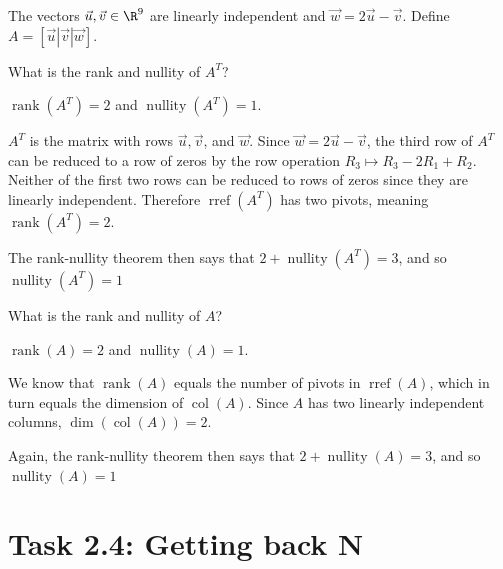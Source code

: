 \documentclass{problemset}
\DeclareMathOperator{\Rref}{rref}
\DeclareMathOperator{\Rank}{rank}
\DeclareMathOperator{\Nullity}{nullity}
\DeclareMathOperator{\Dim}{dim}
\DeclareMathOperator{\Col}{col}
\newcommand{\rref}{\Rref}
\begin{document}
	\question
	The vectors $\vec u,\vec v\in\R^9$ are linearly independent and $\vec w=2\vec u-\vec v$.
	Define $A=[\vec u|\vec v|\vec w]$.
	\begin{parts}
		\item What is the rank and nullity of $A^T$?
			\begin{solution}
				$\Rank(A^T)=2$ and $\Nullity(A^T)=1$.

				$A^T$ is the matrix with rows $\vec u,\vec v$, and $\vec w$. 
				Since $\vec w=2\vec u-\vec v$, the third row of $A^T$ can be 
				reduced to a row of zeros by the row operation 
				$R_3\mapsto R_3-2R_1+R_2$. Neither of the first two rows can be
				reduced to rows of zeros since they are linearly independent. 
				Therefore $\rref(A^T)$ has two pivots, meaning $\Rank(A^T)=2$. 

				The rank-nullity theorem then says that $2+\Nullity(A^T)=3$, and so
				$\Nullity(A^T)=1$
			\end{solution}
		\item What is the rank and nullity of $A$?
			\begin{solution}
				$\Rank(A)=2$ and $\Nullity(A)=1$.

				We know that $\Rank(A)$ equals the number of pivots in $\rref(A)$,
				which in turn equals the dimension of $\Col(A)$. Since $A$ has two
				linearly independent columns, $\Dim(\Col(A))=2$. 

				Again, the rank-nullity theorem then says that $2+\Nullity(A)=3$,
				and so $\Nullity(A)=1$
			\end{solution}
	\end{parts}









\newpage
\pagestyle{iola}
\section*{Task 2.4: Getting back N}
\end{document}
